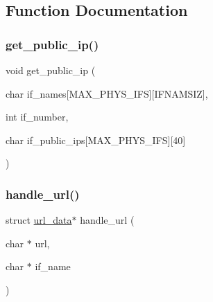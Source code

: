 \subsection{Function Documentation}
\mbox{\label{public-ip_8c_a035017d88204b5d04e2971a7700482e6}} 
\subsubsection{\texorpdfstring{get\+\_\+public\+\_\+ip()}{get\_public\_ip()}}
{\footnotesize\ttfamily void get\+\_\+public\+\_\+ip (\begin{DoxyParamCaption}\item[{char}]{if\+\_\+names\mbox{[}\+M\+A\+X\+\_\+\+P\+H\+Y\+S\+\_\+\+I\+F\+S\mbox{]}\mbox{[}\+I\+F\+N\+A\+M\+S\+I\+Z\mbox{]},  }\item[{int}]{if\+\_\+number,  }\item[{char}]{if\+\_\+public\+\_\+ips\mbox{[}\+M\+A\+X\+\_\+\+P\+H\+Y\+S\+\_\+\+I\+F\+S\mbox{]}\mbox{[}40\mbox{]} }\end{DoxyParamCaption})}

\mbox{\label{public-ip_8c_a546e9ee82a2fff0c37e173d76ab08db4}} 
\subsubsection{\texorpdfstring{handle\+\_\+url()}{handle\_url()}}
{\footnotesize\ttfamily struct \hyperlink{structurl__data}{url\+\_\+data}$\ast$ handle\+\_\+url (\begin{DoxyParamCaption}\item[{char $\ast$}]{url,  }\item[{char $\ast$}]{if\+\_\+name }\end{DoxyParamCaption})}

